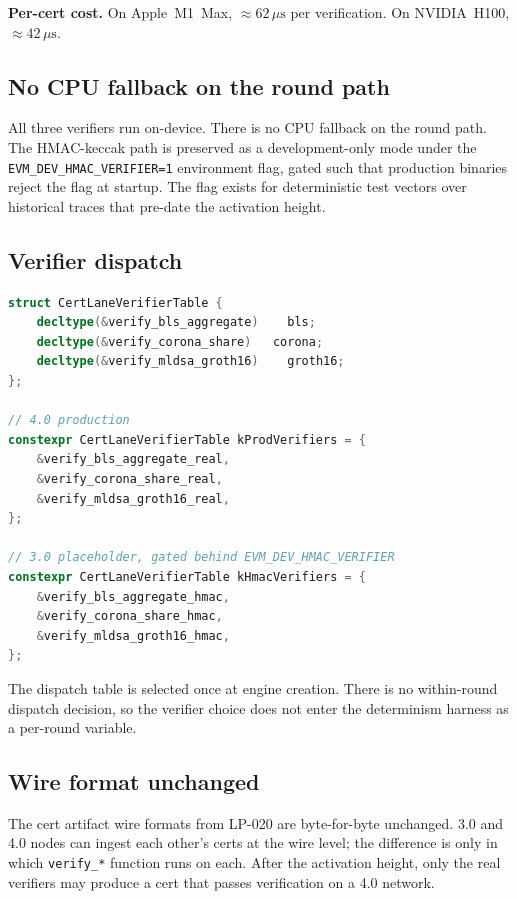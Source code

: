 \textbf{Per-cert cost.} On Apple~M1~Max, $\approx 62\,\mu\text{s}$ per
verification. On NVIDIA~H100, $\approx 42\,\mu\text{s}$.

\subsection{No CPU fallback on the round path}

All three verifiers run on-device. There is no CPU fallback on the
round path. The HMAC-keccak path is preserved as a development-only
mode under the \texttt{EVM\_DEV\_HMAC\_VERIFIER=1} environment flag,
gated such that production binaries reject the flag at startup. The
flag exists for deterministic test vectors over historical traces
that pre-date the activation height.

\subsection{Verifier dispatch}

\begin{lstlisting}[language=C++]
struct CertLaneVerifierTable {
    decltype(&verify_bls_aggregate)    bls;
    decltype(&verify_corona_share)   corona;
    decltype(&verify_mldsa_groth16)    groth16;
};

// 4.0 production
constexpr CertLaneVerifierTable kProdVerifiers = {
    &verify_bls_aggregate_real,
    &verify_corona_share_real,
    &verify_mldsa_groth16_real,
};

// 3.0 placeholder, gated behind EVM_DEV_HMAC_VERIFIER
constexpr CertLaneVerifierTable kHmacVerifiers = {
    &verify_bls_aggregate_hmac,
    &verify_corona_share_hmac,
    &verify_mldsa_groth16_hmac,
};
\end{lstlisting}

The dispatch table is selected once at engine creation. There is no
within-round dispatch decision, so the verifier choice does not enter
the determinism harness as a per-round variable.

\subsection{Wire format unchanged}

The cert artifact wire formats from LP-020 are byte-for-byte
unchanged. 3.0 and 4.0 nodes can ingest each other's certs at the
wire level; the difference is only in which \texttt{verify\_*}
function runs on each. After the activation height, only the real
verifiers may produce a cert that passes verification on a 4.0
network.

